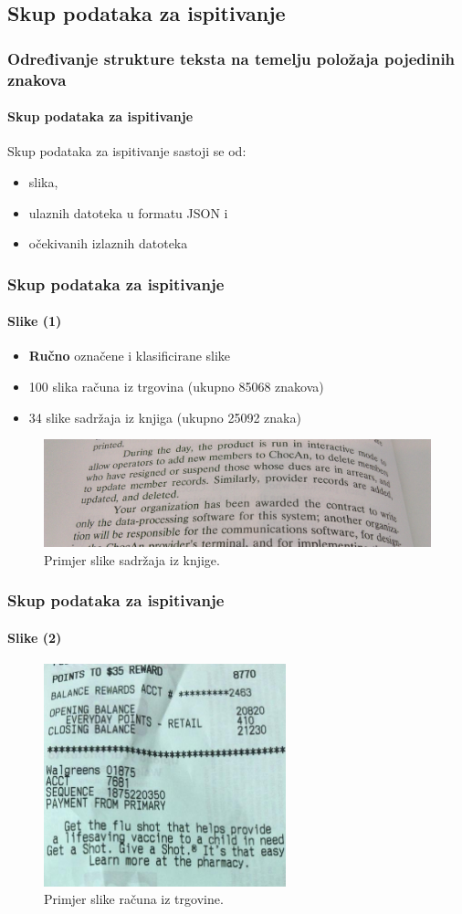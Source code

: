 \documentclass{beamer}
\begin{document}
\subsection{Skup podataka za ispitivanje}
\begin{frame}
\frametitle{Određivanje strukture teksta na temelju položaja pojedinih znakova}
\framesubtitle{Skup podataka za ispitivanje}
Skup podataka za ispitivanje sastoji se od:
\begin{itemize}
    \item slika,
    \item ulaznih datoteka u formatu JSON i
    \item očekivanih izlaznih datoteka
\end{itemize}
\end{frame}
\begin{frame}
\frametitle{Skup podataka za ispitivanje}
\framesubtitle{Slike (1)}
\begin{itemize}
    \item \textbf{Ručno} označene i klasificirane slike
    \item 100 slika računa iz trgovina (ukupno 85068 znakova)
    \item 34 slike sadržaja iz knjiga (ukupno 25092 znaka)
\end{itemize}
\begin{figure}[htb]
    \centering
    \includegraphics[width=\textwidth]{images/book-example-03.jpg}
    \caption{Primjer slike sadržaja iz knjige.}
    \label{fig:book-example-04}
\end{figure}
\end{frame}
\begin{frame}
\frametitle{Skup podataka za ispitivanje}
\framesubtitle{Slike (2)}
\begin{figure}[htb]
    \centering
    \includegraphics[width=7cm]{images/receipt-example-04.jpg}
    \caption{Primjer slike računa iz trgovine.}
    \label{fig:receipt-example-04}
\end{figure}
\end{frame}
\end{document}
